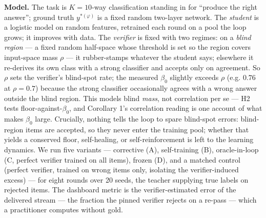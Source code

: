 \documentclass[11pt]{article}
\begin{document}
\textbf{Model.} The task is \(K = 10\)-way classification standing in
for ``produce the right answer''; ground truth \(y^{\ast (\varphi)}\) is
a fixed random two-layer network. The \emph{student} is a logistic model
on random features, retrained each round on a pool the loop grows; it
improves with data. The \emph{verifier} is fixed with two regimes: on a
\emph{blind region} --- a fixed random half-space whose threshold is set
so the region covers input-space mass \(\rho\) --- it rubber-stamps
whatever the student says; elsewhere it re-derives its own class with a
strong classifier and accepts only on agreement. So \(\rho\) sets the
verifier's blind-spot rate; the measured \(\beta_{0}\) slightly exceeds
\(\rho\) (e.g. \(0.76\) at \(\rho = 0.7\)) because the strong classifier
occasionally agrees with a wrong answer outside the blind region. This
models blind \emph{mass}, not correlation per se --- H2 tests
floor-against-\(\beta_{0}\), and Corollary 1's correlation reading is
one account of what makes \(\beta_{0}\) large. Crucially, nothing tells
the loop to spare blind-spot errors: blind-region items are accepted, so
they never enter the training pool; whether that yields a conserved
floor, self-healing, or self-reinforcement is left to the learning
dynamics. We run five variants --- corrective (A), self-training (B),
oracle-in-loop (C, perfect verifier trained on all items), frozen (D),
and a matched control (perfect verifier, trained on wrong items only,
isolating the verifier-induced excess) --- for eight rounds over 20
seeds, the teacher supplying true labels on rejected items. The
dashboard metric is the verifier-estimated error of the delivered stream
--- the fraction the pinned verifier rejects on a re-pass --- which a
practitioner computes without gold.
\end{document}
